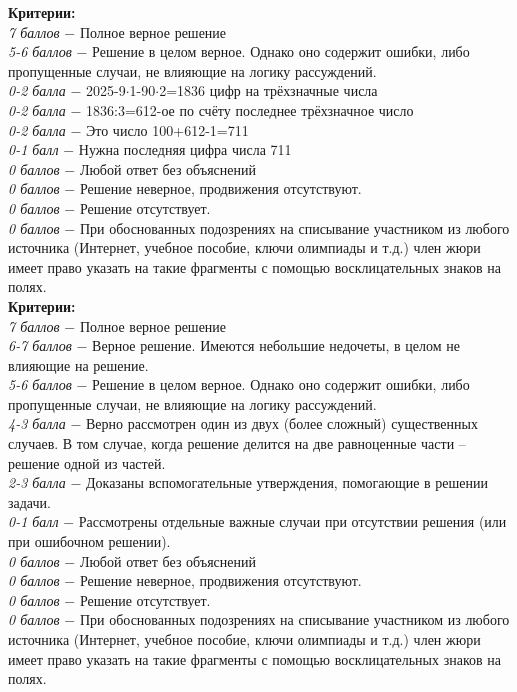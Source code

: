 \newpage


 \textbf{Критерии:} \\
\textit{7 баллов} $-$ Полное верное решение\\
\textit{5-6 баллов} $-$ Решение в целом верное. Однако оно содержит ошибки, либо пропущенные случаи, не влияющие на логику рассуждений.\\
\textit{0-2 балла} $-$ 2025-9$\cdot$1-90$\cdot$2=1836 цифр на трёхзначные числа\\
\textit{0-2 балла} $-$ 1836:3=612-ое по счёту последнее трёхзначное число\\
\textit{0-2 балла} $-$ Это число 100+612-1=711\\
\textit{0-1 балл} $-$ Нужна последняя цифра числа 711\\
\textit{0 баллов} $-$ Любой ответ без объяснений\\
\textit{0 баллов} $-$ Решение неверное, продвижения отсутствуют.\\
\textit{0 баллов} $-$ Решение отсутствует.\\
\textit{0 баллов} $-$ При обоснованных подозрениях на списывание участником из любого источника (Интернет, учебное пособие, ключи олимпиады и т.д.) член жюри имеет право указать на такие фрагменты с помощью восклицательных знаков на полях.\\

 \textbf{Критерии:} \\
\textit{7 баллов} $-$ Полное верное решение\\
\textit{6-7 баллов} $-$ Верное решение. Имеются небольшие недочеты, в целом не влияющие на решение.\\
\textit{5-6 баллов} $-$ Решение в целом верное. Однако оно содержит ошибки, либо пропущенные случаи, не влияющие на логику рассуждений.\\
\textit{4-3 балла} $-$ Верно рассмотрен один из двух (более сложный) существенных случаев. В том случае, когда решение делится на две равноценные части – решение одной из частей. 
\\
\textit{2-3 балла} $-$ Доказаны вспомогательные утверждения, помогающие в решении задачи.
\\
\textit{0-1 балл} $-$ Рассмотрены отдельные важные случаи при отсутствии решения (или при ошибочном решении).\\
\textit{0 баллов} $-$ Любой ответ без объяснений\\
\textit{0 баллов} $-$ Решение неверное, продвижения отсутствуют.\\
\textit{0 баллов} $-$ Решение отсутствует.\\
\textit{0 баллов} $-$ При обоснованных подозрениях на списывание участником из любого источника (Интернет, учебное пособие, ключи олимпиады и т.д.) член жюри имеет право указать на такие фрагменты с помощью восклицательных знаков на полях. \\